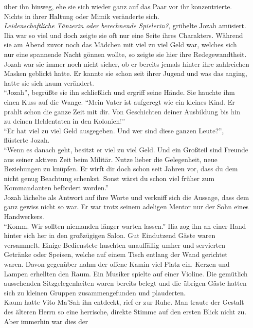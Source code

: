 über ihn hinweg, ehe sie sich wieder ganz auf das Paar vor ihr konzentrierte. Nichts in ihrer 
Haltung oder Mimik veränderte sich.\\
\textit{Leidenschaftliche Tänzerin oder berechnende Spielerin?}, grübelte Jozah amüsiert. Ilia war 
so viel und doch zeigte sie oft nur eine Seite ihres Charakters. Während sie am Abend zuvor noch 
das Mädchen mit viel zu viel Geld war, welches sich nur eine spannende Nacht gönnen wollte, so 
zeigte sie hier ihre Redegewandtheit. Jozah war sie immer noch nicht sicher, ob er bereits jemals 
hinter ihre zahlreichen Masken geblickt hatte. Er kannte sie schon seit ihrer Jugend und was das 
anging, hatte sie sich kaum verändert.\\ 
``Jozah'', begrüßte sie ihn schließlich und ergriff seine Hände. Sie hauchte ihm einen Kuss auf die 
Wange. ``Mein Vater ist aufgeregt wie ein kleines Kind. Er prahlt schon die ganze Zeit mit dir. Von 
Geschichten deiner Ausbildung bis hin zu deinen Heldentaten in den Kolonien!''\\
``Er hat viel zu viel Geld ausgegeben. Und wer sind diese ganzen Leute?'', flüsterte Jozah.\\
``Wenn es danach geht, besitzt er viel zu viel Geld. Und ein Großteil sind Freunde aus seiner 
aktiven Zeit beim Militär. Nutze lieber die Gelegenheit, neue Beziehungen zu knüpfen. Er wirft dir 
doch schon seit Jahren vor, dass du dem nicht genug Beachtung schenkst. Sonst wärst du schon viel 
früher zum Kommandanten befördert worden.''\\
Jozah lächelte als Antwort auf ihre Worte und verkniff sich die Aussage, dass dem ganz gewiss nicht 
so war. Er war trotz seinem adeligen Mentor nur der Sohn eines Handwerkers.\\
``Komm. Wir sollten niemanden länger warten lassen.'' Ilia zog ihn an einer Hand hinter sich her in 
den großzügigen Salon. Gut Eindutzend Gäste waren versammelt. Einige Bedienstete huschten 
unauffällig umher und servierten Getränke oder Speisen, welche auf einem Tisch entlang der Wand 
gerichtet waren. Davon gegenüber nahm der offene Kamin viel Platz ein. Kerzen und Lampen erhellten 
den Raum. Ein Musiker spielte auf einer Violine. Die gemütlich aussehenden Sitzgelegenheiten waren 
bereits belegt und die übrigen Gäste hatten sich zu kleinen Gruppen zusammengefunden und 
plauderten.\\
Kaum hatte Vito Ma'Sah ihn entdeckt, rief er zur Ruhe. Man traute der Gestalt des älteren Herrn so 
eine herrische, direkte Stimme auf den ersten Blick nicht zu. Aber immerhin war dies der 

